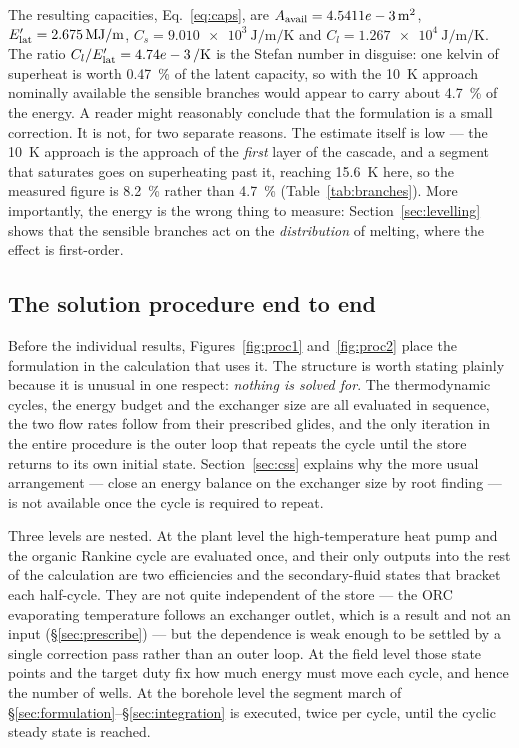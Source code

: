 \noindent
The resulting capacities, Eq.~\eqref{eq:caps}, are
$\Aav=\SI{4.5411e-3}{\meter\squared}$,
$\Elat=\SI{2.675}{\mega\joule\per\meter}$,
$C_{s}=\SI{9.010e3}{\joule\per\meter\per\kelvin}$ and
$C_{l}=\SI{1.267e4}{\joule\per\meter\per\kelvin}$. The ratio
$C_{l}/\Elat=\SI{4.74e-3}{\per\kelvin}$ is the Stefan number in disguise: one
kelvin of superheat is worth \SI{0.47}{\percent} of the latent capacity, so with
the \SI{10}{\kelvin} approach nominally available the sensible branches would
appear to carry about \SI{4.7}{\percent} of the energy. A reader might
reasonably conclude that the formulation is a small correction. It is not, for
two separate reasons. The estimate itself is low --- the \SI{10}{\kelvin}
approach is the approach of the \emph{first} layer of the cascade, and a segment
that saturates goes on superheating past it, reaching \SI{15.6}{\kelvin} here,
so the measured figure is \SI{8.2}{\percent} rather than \SI{4.7}{\percent}
(Table~\ref{tab:branches}). More importantly, the energy is the wrong thing to
measure: Section~\ref{sec:levelling} shows that the sensible branches act on the
\emph{distribution} of melting, where the effect is first-order.

\subsection{The solution procedure end to end}
\label{sec:procedure}

Before the individual results, Figures~\ref{fig:proc1} and~\ref{fig:proc2}
place the formulation in the calculation that uses it. The structure is worth stating plainly because
it is unusual in one respect: \emph{nothing is solved for}. The thermodynamic
cycles, the energy budget and the exchanger size are all evaluated in sequence,
the two flow rates follow from their prescribed glides, and the only iteration
in the entire procedure is the outer loop that repeats the cycle until the store
returns to its own initial state. Section~\ref{sec:css} explains why the more
usual arrangement --- close an energy balance on the exchanger size by root
finding --- is not available once the cycle is required to repeat.

Three levels are nested. At the plant level the high-temperature heat pump and
the organic Rankine cycle are evaluated once, and their only outputs into the
rest of the calculation are two efficiencies and the secondary-fluid states that
bracket each half-cycle. They are not quite independent of the store --- the ORC
evaporating temperature follows an exchanger outlet, which is a result and not
an input (\S\ref{sec:prescribe}) --- but the dependence is weak enough to be
settled by a single correction pass rather than an outer loop. At the field
level those state points and the target duty fix how much energy must move each
cycle, and hence the number of wells. At the borehole level the segment march of
\S\ref{sec:formulation}--\S\ref{sec:integration} is executed, twice per cycle,
until the cyclic steady state is reached.

